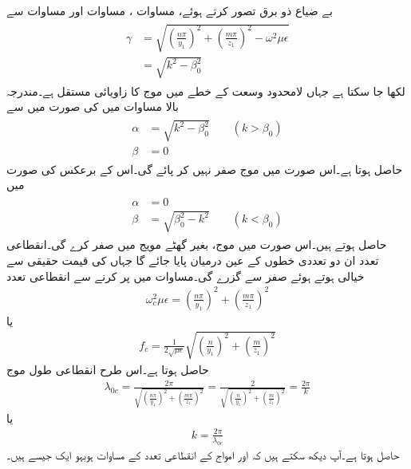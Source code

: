 بے ضیاع ذو برق  تصور کرتے ہوئے، مساوات ،  مساوات  اور مساوات  سے
\begin{gather}
\begin{aligned}\label{مساوات_مویج_عرضی_مقناطیسی_مستقل_موج}
\gamma&=\sqrt{\left(\frac{n\pi}{y_1}\right)^2+\left(\frac{m\pi}{z_1}\right)^2-\omega^2 \mu \epsilon}\\
&=\sqrt{k^2-\beta_0^2}
\end{aligned}
\end{gather}
لکھا جا سکتا ہے جہاں  لامحدود وسعت کے خطے میں موج کا زاویائی مستقل  ہے۔مندرجہ بالا مساوات میں  کی صورت میں  سے
\begin{gather}
\begin{aligned}\label{مساوات_مویج_تضعیفی_مستقل_الف}
\alpha&=\sqrt{k^2-\beta_0^2}  \quad \quad (k>\beta_0)\\
\beta &=0
\end{aligned}
\end{gather}
حاصل ہوتا ہے۔اس صورت میں موج صفر نہیں کر پائے گی۔اس کے برعکس  کی صورت میں
\begin{gather}
\begin{aligned}\label{مساوات_مویج_زاویائی_مستقل_الف}
\alpha&=0\\
\beta &= \sqrt{\beta_0^2-k^2}  \quad \quad (k<\beta_0)
\end{aligned}
\end{gather}
حاصل ہوتے ہیں۔اس صورت میں موج، بغیر گھٹے مویج میں صفر کرے گی۔انقطاعی تعدد ان دو تعددی خطوں کے عین درمیان پایا جائے گا جہاں  کی قیمت حقیقی سے خیالی ہوتے ہوئے صفر سے گزرے گی۔مساوات  میں  پر کرنے سے انقطاعی تعدد
\begin{align}
\omega_c^2 \mu \epsilon =\left(\frac{n\pi}{y_1}\right)^2+\left(\frac{m\pi}{z_1}\right)^2
\end{align}
یا
\begin{align}
f_c =\frac{1}{2 \sqrt{\mu \epsilon}}\sqrt{\left(\frac{n}{y_1}\right)^2+\left(\frac{m}{z_1}\right)^2}
\end{align}
حاصل ہوتا ہے۔اس طرح انقطاعی طول موج
\begin{align}\label{مساوات_مویج_مستطیلی_انقطاعی_طول}
\lambda_{0c}=\frac{2\pi}{\sqrt{\left(\frac{n\pi}{y_1}\right)^2+\left(\frac{m\pi}{z_1}\right)^2}}=\frac{2}{\sqrt{\left(\frac{n}{y_1}\right)^2+\left(\frac{m}{z_1}\right)^2}}=\frac{2\pi}{k}
\end{align}
یا
\begin{align}
k=\frac{2\pi}{\lambda_{0c}}
\end{align}
حاصل ہوتا ہے۔آپ دیکھ سکتے ہیں کہ  اور  امواج کے انقطاعی تعدد کے مساوات ہوبہو ایک جیسے ہیں۔


